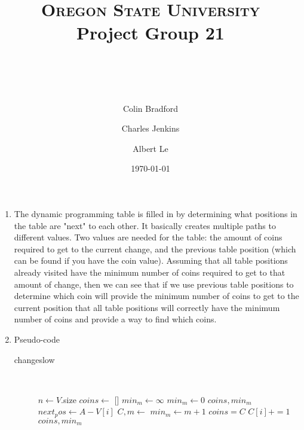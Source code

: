\documentclass[paper=a4, fontsize=11pt]{scrartcl} %
\title{ 
    \normalfont \normalsize 
    \textsc{Oregon State University} \\ [25pt]
    \large Project Group 21
    \horrule{0.5pt} \\[0.4cm] %
    \huge \hwtitle \\ %
    \horrule{2pt} \\[0.5cm] %
}
\author{
    Colin Bradford
    \and
    Charles Jenkins
    \and
    Albert Le
} %
\date{\normalsize\today} %
\numberwithin{equation}{section} %
\numberwithin{figure}{section} %
\numberwithin{table}{section} %
\begin{document}
\maketitle %

\begin{enumerate}
    \item The dynamic programming table is filled in by determining what positions
    in the table are "next" to each other. It basically creates multiple paths 
    to different values. Two values are needed for the table: the amount of coins 
    required to get to the current change, and the previous table position 
    (which can be found if you have the coin value). Assuming that all table
    positions already visited have the minimum number of coins required to get
    to that amount of change, then we can see that if we use previous table
    positions to determine which coin will provide the minimum number of coins
    to get to the current position that all table positions will correctly have
    the minimum number of coins and provide a way to find which coins.

    \item Pseudo-code
    \begin{description}
        \item[changeslow] \hfill \\
        \begin{algorithmic}
                \State $n \gets V$.size
                \State $coins \gets$ []
                \State $min_m \gets \infty$
                    \State $min_m \gets 0$
                    \Return $coins, min_m$
                \EndIf
                    \State $next_pos \gets A - V[i]$
                        \State $C, m \gets$ 
                            \State $min_m \gets m + 1$
                            \State $coins = C$
                            \State $C[i] += 1$
                        \EndIf
                    \EndIf
                \EndFor
                \State \Return $coins, min_m$
            \EndFunction
        \end{algorithmic}


\end{description}
\end{enumerate}
\end{document}
